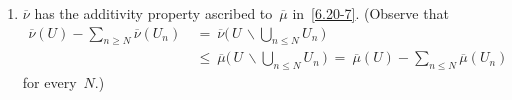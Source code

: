 \documentclass[main.tex]{subfiles}
\begin{document}
\begin{psec}{6.20}
\begin{enumerate}
If $A,B\in\mathcal A$
and $\hat A=\hat B$,
then (see~\ref{6.20-3})
we have $\mu(A\backslash B)=\mu(B\backslash A)=0$,
and therefore $\nu(A\backslash B)= \nu(B\backslash A)=0$;
by the argument of~\ref{6.20-3}
this implies $\nu(A)=\nu(B)$.
Hence, the formula
\begin{equation*}
\overline\nu(\hat A)\ :=\ \nu(A)\qquad(A\in\mathcal A)
\end{equation*}
defines an (additive) function~$\overline\nu$ on $\clopen(Y)$ with
\begin{equation*}
\overline\nu(U)\ \leq\ \overline\mu(U)\qquad(U\in\clopen(U)\,)\htam{.}
\end{equation*}
%
\item\label{6.20-9}
$\overline\nu$ has the additivity property ascribed to~$\overline\mu$
in~\ref{6.20-7}.
(Observe that 
\begin{alignat*}{2}
\textstyle\overline\nu(U)-\sum_{n\geq N} \overline\nu(U_n)
\ &=\    \overline\nu\bigl(\,U\,\backslash
          \textstyle\bigcup_{n\leq N}U_n\,\bigr) \\
\ &\leq\ \overline\mu\bigl(\,U\,\backslash
          \textstyle \bigcup_{n\leq N}U_n\,\bigr)
\ =\     \overline\mu(U)-\sum_{n\leq N}\overline\mu(U_n)
\end{alignat*}
for every~$N$.)
\end{enumerate}
\end{psec}
%
%
\end{document}
